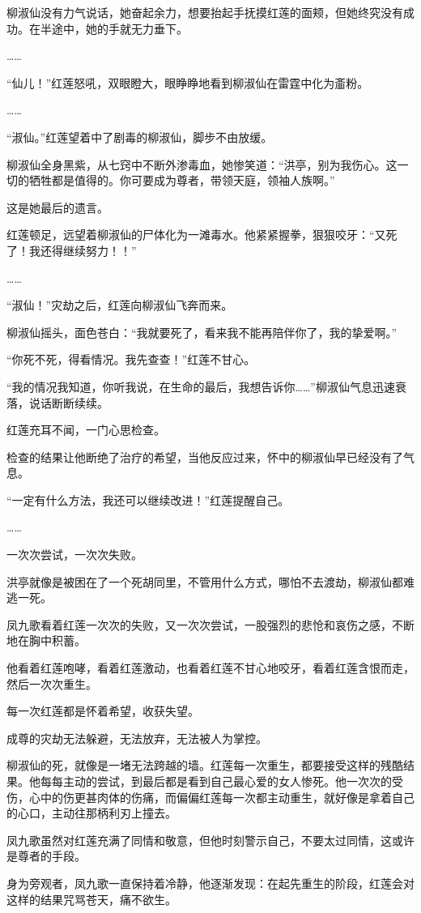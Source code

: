 \begin{this_body}
柳淑仙没有力气说话，她奋起余力，想要抬起手抚摸红莲的面颊，但她终究没有成功。在半途中，她的手就无力垂下。

……

“仙儿！”红莲怒吼，双眼瞪大，眼睁睁地看到柳淑仙在雷霆中化为齑粉。

……

“淑仙。”红莲望着中了剧毒的柳淑仙，脚步不由放缓。

柳淑仙全身黑紫，从七窍中不断外渗毒血，她惨笑道：“洪亭，别为我伤心。这一切的牺牲都是值得的。你可要成为尊者，带领天庭，领袖人族啊。”

这是她最后的遗言。

红莲顿足，远望着柳淑仙的尸体化为一滩毒水。他紧紧握拳，狠狠咬牙：“又死了！我还得继续努力！！”

……

“淑仙！”灾劫之后，红莲向柳淑仙飞奔而来。

柳淑仙摇头，面色苍白：“我就要死了，看来我不能再陪伴你了，我的挚爱啊。”

“你死不死，得看情况。我先查查！”红莲不甘心。

“我的情况我知道，你听我说，在生命的最后，我想告诉你……”柳淑仙气息迅速衰落，说话断断续续。

红莲充耳不闻，一门心思检查。

检查的结果让他断绝了治疗的希望，当他反应过来，怀中的柳淑仙早已经没有了气息。

“一定有什么方法，我还可以继续改进！”红莲提醒自己。

……

一次次尝试，一次次失败。

洪亭就像是被困在了一个死胡同里，不管用什么方式，哪怕不去渡劫，柳淑仙都难逃一死。

凤九歌看着红莲一次次的失败，又一次次尝试，一股强烈的悲怆和哀伤之感，不断地在胸中积蓄。

他看着红莲咆哮，看着红莲激动，也看着红莲不甘心地咬牙，看着红莲含恨而走，然后一次次重生。

每一次红莲都是怀着希望，收获失望。

成尊的灾劫无法躲避，无法放弃，无法被人为掌控。

柳淑仙的死，就像是一堵无法跨越的墙。红莲每一次重生，都要接受这样的残酷结果。他每每主动的尝试，到最后都是看到自己最心爱的女人惨死。他一次次的受伤，心中的伤更甚肉体的伤痛，而偏偏红莲每一次都主动重生，就好像是拿着自己的心口，主动往那柄利刃上撞去。

凤九歌虽然对红莲充满了同情和敬意，但他时刻警示自己，不要太过同情，这或许是尊者的手段。

身为旁观者，凤九歌一直保持着冷静，他逐渐发现：在起先重生的阶段，红莲会对这样的结果咒骂苍天，痛不欲生。


\end{this_body}
